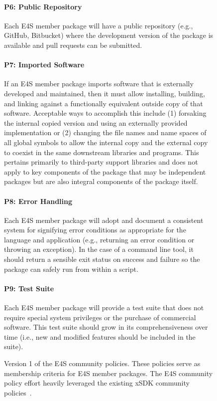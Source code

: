 \begin{figure}[h!]
\begin{mdframed}
\paragraph{P6: Public Repository} Each E4S member package will have a public repository (e.g., GitHub, Bitbucket) where the development version of the package is available and pull requests can be submitted.%
\vspace{12pt}

\paragraph{P7: Imported Software} If an E4S member package imports software that is externally developed and maintained, then it must allow installing, building, and linking against a functionally equivalent outside copy of that software. Acceptable ways to accomplish this include (1) forsaking the internal copied version and using an externally provided implementation or (2) changing the file names and name spaces of all global symbols to allow the internal copy and the external copy to coexist in the same downstream libraries and programs. This pertains primarily to third-party support libraries and does not apply to key components of the package that may be independent packages but are also integral components of the package itself.
\vspace{12pt}

\paragraph{P8: Error Handling} Each E4S member package will adopt and document a consistent system for signifying error conditions as appropriate for the language and application (e.g., returning an error condition or throwing an exception). In the case of a command line tool, it should return a sensible exit status on success and failure so the package can safely run from within a script.
\vspace{12pt}

\paragraph{P9: Test Suite} Each E4S member package will provide a test suite that does not require special system privileges or the purchase of commercial software. This test suite should grow in its comprehensiveness over time (i.e., new and modified features should be included in the suite).
\vspace{12pt}
\end{mdframed}
        \caption{Version 1 of the E4S community policies. These policies serve as membership criteria for E4S member packages. The E4S community policy effort heavily leveraged the existing xSDK community policies~\cite{xsdk-policies:homepage}.}
        \label{fig:E4S-Community-Policies-V1}
\end{figure}

